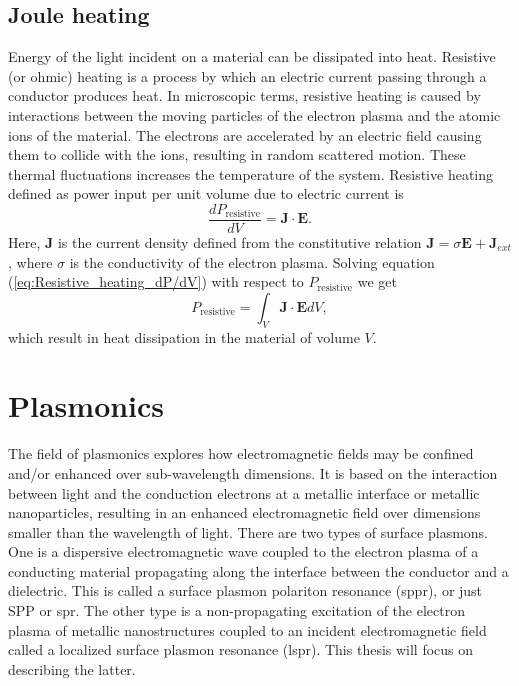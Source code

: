 \subsection{Joule heating}
Energy of the light incident on a material can be dissipated into heat. Resistive (or ohmic) heating is a process by which an electric current passing through a conductor produces heat. In microscopic terms, resistive heating is caused by interactions between the moving particles of the electron plasma and the atomic ions of the material. The electrons are accelerated by an electric field causing them to collide with the ions, resulting in random scattered motion. These thermal fluctuations increases the temperature of the system. Resistive heating defined as power input per unit volume due to electric current is \cite{jackson}
\begin{equation}
    \frac{dP_{\text{resistive}}}{dV} = \mathbf{J}\cdot\mathbf{E}.
    \label{eq:Resistive_heating_dP/dV}
\end{equation}
Here, $\mathbf{J}$ is the current density defined from the constitutive relation $\mathbf{J}=\sigma\mathbf{E}+\mathbf{J}_{ext}$, where $\sigma$ is the conductivity of the electron plasma.  Solving equation (\ref{eq:Resistive_heating_dP/dV}) with respect to $P_{\text{resistive}}$ we get
\begin{equation}
    P_{\text{resistive}} = \int_V \mathbf{J}\cdot\mathbf{E} dV,
    \label{eq:Resistive_heating_P}
\end{equation}
which result in heat dissipation in the material of volume $V$.

\section{Plasmonics}
The field of plasmonics explores how electromagnetic fields may be confined and/or enhanced over sub-wavelength dimensions. It is based on the interaction between light and the conduction electrons at a metallic interface or metallic nanoparticles, resulting in an enhanced electromagnetic field over dimensions smaller than the wavelength of light. There are two types of surface plasmons. One is a dispersive electromagnetic wave coupled to the electron plasma of a conducting material propagating along the interface between the conductor and a dielectric. This is called a surface plasmon polariton resonance (\ac{sppr}), or just SPP or \ac{spr}. The other type is a non-propagating excitation of the electron plasma of metallic nanostructures coupled to an incident electromagnetic field called a localized surface plasmon resonance (\ac{lspr}). This thesis will focus on describing the latter.

